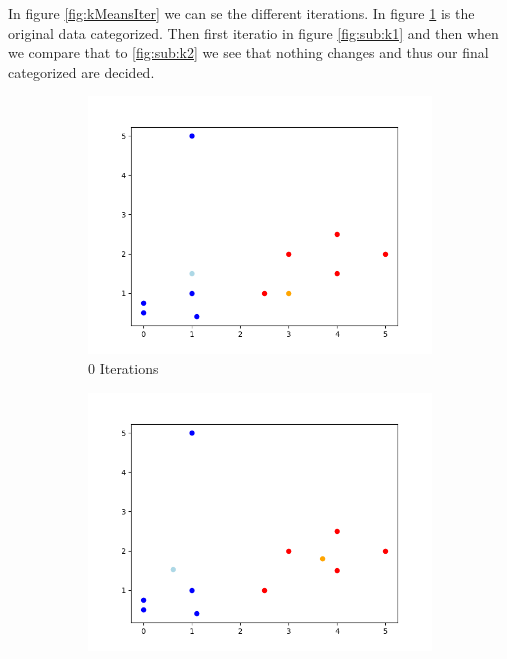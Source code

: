 \documentclass{article}
\begin{document}
    In figure \ref{fig:kMeansIter} we can se the different iterations. In figure \ref{fig:sub:k0} is the original data categorized. Then first iteratio in figure \ref{fig:sub:k1} and then when we compare that to \ref{fig:sub:k2} we see that nothing changes and thus our final categorized are decided.
    \begin{figure}[H]
        \centering
        \begin{subfigure}{0.32\textwidth}
            \centering
            \includegraphics[width=1\textwidth]{k0.png}
            \caption{0 Iterations}
            \label{fig:sub:k0}
        \end{subfigure}
        \begin{subfigure}{0.32\textwidth}
            \centering
            \includegraphics[width=1\textwidth]{k1.png}

\end{subfigure}
\end{figure}
\end{document}
